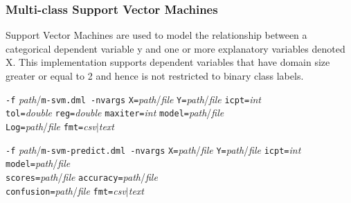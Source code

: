 \subsubsection{Multi-class Support Vector Machines}
\label{msvm}


Support Vector Machines are used to model the relationship between a categorical 
dependent variable y and one or more explanatory variables denoted X. This 
implementation supports dependent variables that have domain size greater or
equal to 2 and hence is not restricted to binary class labels.
\\


\begin{tabbing}
\texttt{-f} \textit{path}/\texttt{m-svm.dml -nvargs}
\=\texttt{X=}\textit{path}/\textit{file} 
  \texttt{Y=}\textit{path}/\textit{file}
  \texttt{icpt=}\textit{int}\\
\>\texttt{tol=}\textit{double} 
  \texttt{reg=}\textit{double}
  \texttt{maxiter=}\textit{int} 
  \texttt{model=}\textit{path}/\textit{file}\\
\>\texttt{Log=}\textit{path}/\textit{file}
  \texttt{fmt=}\textit{csv}$\vert$\textit{text}
\end{tabbing}

\begin{tabbing}
\texttt{-f} \textit{path}/\texttt{m-svm-predict.dml -nvargs}
\=\texttt{X=}\textit{path}/\textit{file} 
  \texttt{Y=}\textit{path}/\textit{file}
  \texttt{icpt=}\textit{int}
  \texttt{model=}\textit{path}/\textit{file}\\
\>\texttt{scores=}\textit{path}/\textit{file}
  \texttt{accuracy=}\textit{path}/\textit{file}\\
\>\texttt{confusion=}\textit{path}/\textit{file}
  \texttt{fmt=}\textit{csv}$\vert$\textit{text}
\end{tabbing}


